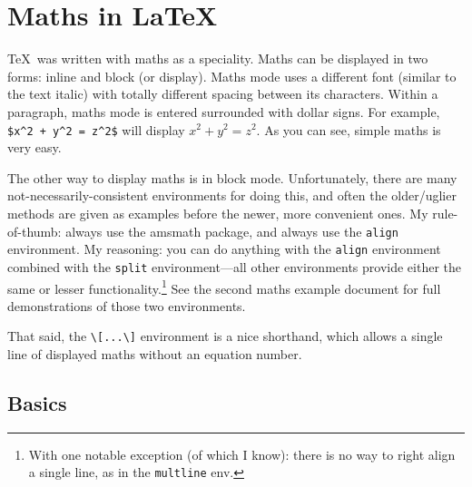 \documentclass[12pt,article,fleqn]{memoir}
\begin{document}
\chapter*{Maths in \LaTeX}

\TeX\ was written with maths as a speciality. Maths can be displayed in two forms: inline and block (or display). Maths mode uses a different font (similar to the text italic) with totally different spacing between its characters. Within a paragraph, maths mode is entered surrounded with dollar signs. For example, \verb|$x^2 + y^2 = z^2$| will display $x^2 + y^2 = z^2$. As you can see, simple maths is very easy.

The other way to display maths is in block mode. Unfortunately, there are many not-necessarily-consistent environments for doing this, and often the older/uglier methods are given as examples before the newer, more convenient ones. My rule-of-thumb: always use the \textsf{amsmath} package, and always use the \texttt{align} environment. My reasoning: you can do anything with the \texttt{align} environment combined with the \texttt{split} environment---all other environments provide either the same or lesser functionality.\footnote{With one notable exception (of which I know): there is no way to right align a single line, as in the \texttt{multline} env.} See the second maths example document for full demonstrations of those two environments.

That said, the \verb|\[...\]| environment is a nice shorthand, which allows a single line of displayed maths without an equation number.

\section*{Basics}
\end{document}
